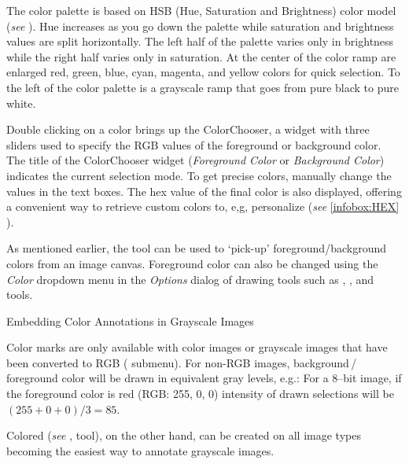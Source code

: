 The color palette is based on HSB (Hue, Saturation and Brightness)
color model (\emph{see} ). Hue increases
as you go down the palette while saturation and brightness values
are split horizontally. The left half of the palette varies only in
brightness while the right half varies only in saturation. At the
center of the color ramp are enlarged red, green, blue, cyan, magenta,
and yellow colors for quick selection. To the left of the color palette
is a grayscale ramp that goes from pure black to pure white.

Double clicking
on a color brings up the ColorChooser, a widget with three sliders
used to specify the RGB values of the foreground or background color.
The title of the ColorChooser widget (\emph{Foreground Color} or \emph{Background
Color}) indicates the current selection mode. To get precise colors,
manually change the values in the text boxes. The hex
value of the final color is also displayed, offering a convenient
way to retrieve custom colors to, e,g, personalize 
(\emph{see} \ref{infobox:HEX} ).

As mentioned earlier, the  tool can be
used to `pick-up' foreground/background colors from an image canvas.
Foreground color can also be changed using the \emph{Color} dropdown
menu in the \emph{Options} dialog of drawing tools such as ,
,  and 
tools.



\begin{infobox}
\caption{\label{infobox:Color}Embedding Color Annotations in Grayscale Images}


\noindent {}Color marks are only
available with color images or grayscale images that have been converted
to RGB (
submenu). For non-RGB images, background\,/\,foreground color will
be drawn in equivalent gray levels, e.g.: For a 8--bit image, if the
foreground color is red (RGB: 255, 0, 0) intensity of drawn selections
will be $(255+0+0)/3=85$. \medskip{}


\noindent Colored   (\emph{see} ,
 tool), on the other hand, can be created
on all image types becoming the easiest way to annotate grayscale
images.
\end{infobox}



